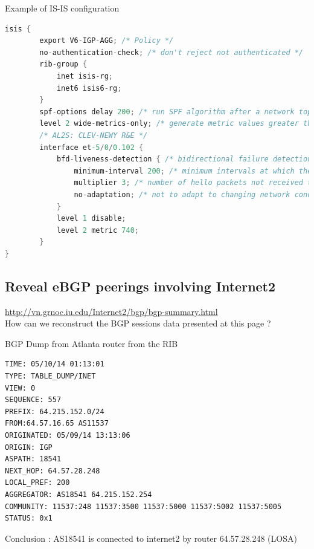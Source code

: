 \documentclass[usenames,dvipsnames]{beamer}
\begin{document}
\begin{frame}[fragile]{Example of IS-IS configuration}
\begin{lstlisting}[language=C]
 isis {
        export V6-IGP-AGG; /* Policy */
        no-authentication-check; /* don't reject not authenticated */
        rib-group {
            inet isis-rg;
            inet6 isis6-rg;
        }
        spf-options delay 200; /* run SPF algorithm after a network topology change */
        level 2 wide-metrics-only; /* generate metric values greater than 63 */
        /* AL2S: CLEV-NEWY R&E */
        interface et-5/0/0.102 {
            bfd-liveness-detection { /* bidirectional failure detection */ 
                minimum-interval 200; /* minimum intervals at which the local routing device transmits Hello packets */
                multiplier 3; /* number of hello packets not received to set int down */
                no-adaptation; /* not to adapt to changing network conditions */
            }
            level 1 disable;
            level 2 metric 740;
        }
}
\end{lstlisting}

\end{frame}


\subsection{Reveal eBGP peerings involving Internet2}
\begin{frame}{\insertsubsection}
\href{http://vn.grnoc.iu.edu/Internet2/bgp/bgp-summary.html}{http://vn.grnoc.iu.edu/Internet2/bgp/bgp-summary.html}\\
How can we reconstruct the BGP sessions data presented at this page ?
\end{frame}


\begin{frame}[fragile]{BGP Dump from Atlanta router from the RIB}

\begin{lstlisting}
TIME: 05/10/14 01:13:01
TYPE: TABLE_DUMP/INET
VIEW: 0
SEQUENCE: 557
PREFIX: 64.215.152.0/24
FROM:64.57.16.65 AS11537
ORIGINATED: 05/09/14 13:13:06
ORIGIN: IGP
ASPATH: 18541
NEXT_HOP: 64.57.28.248
LOCAL_PREF: 200
AGGREGATOR: AS18541 64.215.152.254
COMMUNITY: 11537:248 11537:3500 11537:5000 11537:5002 11537:5005
STATUS: 0x1
\end{lstlisting}

Conclusion : AS18541 is connected to internet2 by router 64.57.28.248 (LOSA)

\end{frame}
\end{document}
